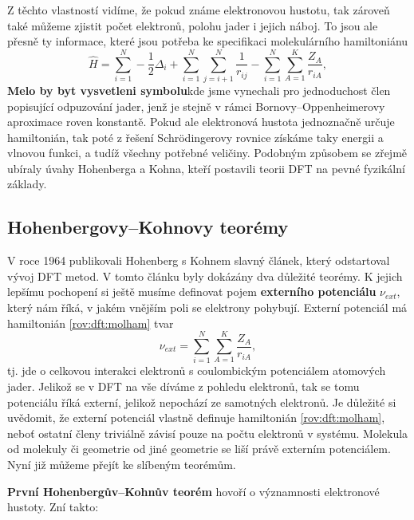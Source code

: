 Z těchto vlastností vidíme, že pokud známe elektronovou hustotu, tak zároveň také můžeme zjistit počet elektronů, polohu jader i jejich náboj. To jsou ale přesně ty informace, které jsou potřeba ke specifikaci molekulárního hamiltoniánu
\begin{equation}
\hat{H}=\sum_{i=1}^N -\frac{1}{2}\Delta_i+\sum_{i=1}^N\sum_{j=i+1}^N\frac{1}{r_{ij}}-\sum_{i=1}^N\sum_{A=1}^K \frac{Z_A}{r_{iA}} ,
\label{rov:dft:molham}
\end{equation}
\textbf{Melo by byt vysvetleni symbolu}kde jsme vynechali pro jednoduchost člen popisující odpuzování jader, jenž je stejně v rámci Bornovy--Oppenheimerovy aproximace roven konstantě. Pokud ale elektronová hustota jednoznačně určuje hamiltonián, tak poté z řešení Schr\"odingerovy rovnice získáme taky energii a vlnovou funkci, a tudíž všechny potřebné veličiny. Podobným způsobem se zřejmě ubíraly úvahy Hohenberga a Kohna, kteří postavili teorii DFT na pevné fyzikální základy.

\subsection{Hohenbergovy--Kohnovy teorémy}

V roce 1964 publikovali Hohenberg s Kohnem slavný článek, který odstartoval vývoj DFT metod.
V tomto článku byly dokázány dva důležité teorémy. K jejich lepšímu pochopení si ještě musíme definovat pojem \textbf{externího potenciálu} $\nu_{ext}$, který nám říká, v jakém vnějším poli se elektrony pohybují. Externí potenciál má hamiltonián \eqref{rov:dft:molham} tvar
\begin{equation}
\nu_{ext} = \sum_{i=1}^N\sum_{A=1}^K \frac{Z_A}{r_{iA}} ,
\end{equation} 
tj. jde o celkovou interakci elektronů s coulombickým potenciálem atomových jader. Jelikož se v DFT na vše díváme z pohledu elektronů, tak se tomu potenciálu říká externí, jelikož nepochází ze samotných elektronů. Je důležité si uvědomit, že externí potenciál vlastně definuje hamiltonián \eqref{rov:dft:molham}, neboť ostatní členy triviálně závisí pouze na počtu elektronů v systému. Molekula od molekuly či geometrie od jiné geometrie se liší právě externím potenciálem. Nyní již můžeme přejít ke slíbeným teorémům.

\textbf{První Hohenbergův--Kohnův teorém} hovoří o významnosti elektronové hustoty. Zní takto:

\bigskip
\noindent {}

